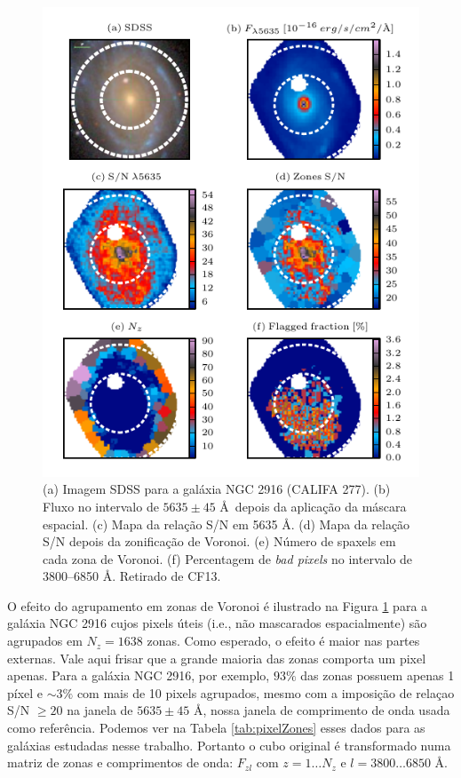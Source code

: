 \begin{figure}
	\includegraphics[width=1.0\textwidth]{figuras/figCF13fig1.pdf}
    \caption[Máscara espacial, zonas de Voronoi e flags para a galáxia NGC 2916 (CALIFA 277).]
    {(a) Imagem SDSS para a galáxia NGC 2916 (CALIFA 277). (b) Fluxo no intervalo de $5635 \pm 45$ \AA\ depois da
    aplicação da máscara espacial. (c) Mapa da relação S/N em 5635 \AA. (d) Mapa da relação S/N depois da zonificação de
    Voronoi. (e) Número de spaxels em cada zona de Voronoi. (f) Percentagem de {\em bad pixels} no intervalo
    de 3800--6850 \AA. Retirado de CF13.}
   	\label{fig:zonesfig1CF13}
\end{figure}

O efeito do agrupamento em zonas de Voronoi é ilustrado na Figura \ref{fig:zonesfig1CF13} para a galáxia NGC 2916 cujos
pixels úteis (i.e., não mascarados espacialmente) são agrupados em $N_z = 1638$ zonas. Como esperado, o efeito é maior
nas partes externas. Vale aqui frisar que a grande maioria das zonas comporta um pixel apenas. Para a galáxia NGC 2916,
por exemplo, $93\%$ das zonas possuem apenas 1 píxel e $\sim 3\%$ com mais de 10 pixels agrupados, mesmo com a imposição
de relaçao S/N $\ge 20$ na janela de $5635 \pm 45$ \AA, nossa janela de comprimento de onda usada como referência.
Podemos ver na Tabela \ref{tab:pixelZones} esses dados para as galáxias estudadas nesse trabalho. Portanto o cubo
original é transformado numa matriz de zonas e comprimentos de onda: $F_{zl}$ com $z = 1 \ldots N_z$ e $l = 3800 \ldots
6850$ \AA.

